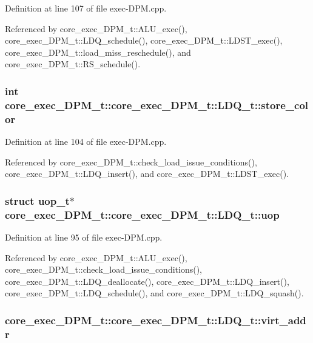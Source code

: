 Definition at line 107 of file exec-DPM.cpp.

Referenced by core\_\-exec\_\-DPM\_\-t::ALU\_\-exec(), core\_\-exec\_\-DPM\_\-t::LDQ\_\-schedule(), core\_\-exec\_\-DPM\_\-t::LDST\_\-exec(), core\_\-exec\_\-DPM\_\-t::load\_\-miss\_\-reschedule(), and core\_\-exec\_\-DPM\_\-t::RS\_\-schedule().
\subsubsection[{store\_\-color}]{\setlength{\rightskip}{0pt plus 5cm}int core\_\-exec\_\-DPM\_\-t::core\_\-exec\_\-DPM\_\-t::LDQ\_\-t::store\_\-color}\label{structcore__exec__DPM__t_1_1LDQ__t_1f4a7cd8f60161109737d9722f60d6fc}




Definition at line 104 of file exec-DPM.cpp.

Referenced by core\_\-exec\_\-DPM\_\-t::check\_\-load\_\-issue\_\-conditions(), core\_\-exec\_\-DPM\_\-t::LDQ\_\-insert(), and core\_\-exec\_\-DPM\_\-t::LDST\_\-exec().
\subsubsection[{uop}]{\setlength{\rightskip}{0pt plus 5cm}struct {\bf uop\_\-t}$\ast$ core\_\-exec\_\-DPM\_\-t::core\_\-exec\_\-DPM\_\-t::LDQ\_\-t::uop\hspace{0.3cm}{\tt  [read]}}\label{structcore__exec__DPM__t_1_1LDQ__t_bf45eb3853f62915fa9ca4a9f748aced}




Definition at line 95 of file exec-DPM.cpp.

Referenced by core\_\-exec\_\-DPM\_\-t::ALU\_\-exec(), core\_\-exec\_\-DPM\_\-t::check\_\-load\_\-issue\_\-conditions(), core\_\-exec\_\-DPM\_\-t::LDQ\_\-deallocate(), core\_\-exec\_\-DPM\_\-t::LDQ\_\-insert(), core\_\-exec\_\-DPM\_\-t::LDQ\_\-schedule(), and core\_\-exec\_\-DPM\_\-t::LDQ\_\-squash().
\subsubsection[{virt\_\-addr}]{ core\_\-exec\_\-DPM\_\-t::core\_\-exec\_\-DPM\_\-t::LDQ\_\-t::virt\_\-addr}\label{structcore__exec__DPM__t_1_1LDQ__t_a4e96c4d36187d57b55b3ca3720475d6}




